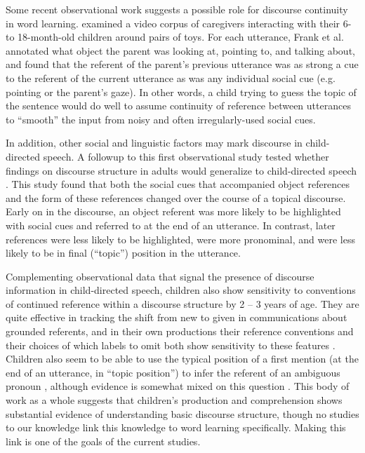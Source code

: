 \documentclass[man]{apa2}
\begin{document}
Some recent observational work suggests a possible role for discourse continuity in word learning.  examined a video corpus of caregivers interacting with their 6- to 18-month-old children around pairs of toys. For each utterance, Frank et al. annotated what object the parent was looking at, pointing to, and talking about, and found that the referent of the parent's previous utterance was as strong a cue to the referent of the current utterance as was any individual social cue (e.g. pointing or the parent's gaze). In other words, a child trying to guess the topic of the sentence would do well to assume continuity of reference between utterances to ``smooth'' the input from noisy and often irregularly-used social cues.

In addition, other social and linguistic factors may mark discourse in child-directed speech. A followup to this first observational study tested whether findings on discourse structure in adults would generalize to child-directed speech \cite{rohde2014}. This study found that both the social cues that accompanied object references and the form of these references changed over the course of a topical discourse. Early on in the discourse, an object referent was more likely to be highlighted with social cues and referred to at the end of an utterance. In contrast, later references were less likely to be highlighted, were more pronominal, and were less likely to be in final (``topic'') position in the utterance. 

Complementing observational data that signal the presence of discourse information in child-directed speech, children also show sensitivity to conventions of continued reference within a discourse structure by 2 -- 3 years of age.  They are quite effective in tracking the shift from new to given in communications about grounded referents, and in their own productions their reference conventions and their choices of which labels to omit both show sensitivity to these features \cite{allen2000, bates1976, greenfield1976, clancy2004, skarabela2007}.  Children also seem to be able to use the typical position of a first mention (at the end of an utterance, in ``topic position'') to infer the referent of an ambiguous pronoun \cite{song2005, song2007, pyykkonen2010, hartshorne2014}, although evidence is somewhat mixed on this question \cite{arnold2007}. This body of work as a whole suggests that children's production and comprehension shows substantial evidence of understanding basic discourse structure, though no studies to our knowledge link this knowledge to word learning specifically. Making this link is one of the goals of the current studies.
\end{document}
